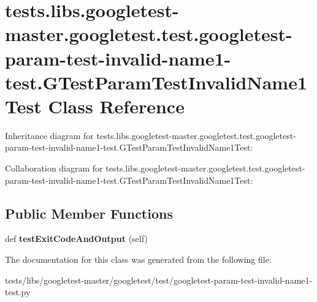 \hypertarget{classtests_1_1libs_1_1googletest-master_1_1googletest_1_1test_1_1googletest-param-test-invalid-na12366dd0912c1a7adea838865d4fa29}{}\section{tests.\+libs.\+googletest-\/master.googletest.\+test.\+googletest-\/param-\/test-\/invalid-\/name1-\/test.G\+Test\+Param\+Test\+Invalid\+Name1\+Test Class Reference}
\label{classtests_1_1libs_1_1googletest-master_1_1googletest_1_1test_1_1googletest-param-test-invalid-na12366dd0912c1a7adea838865d4fa29}


Inheritance diagram for tests.\+libs.\+googletest-\/master.googletest.\+test.\+googletest-\/param-\/test-\/invalid-\/name1-\/test.G\+Test\+Param\+Test\+Invalid\+Name1\+Test\+:


Collaboration diagram for tests.\+libs.\+googletest-\/master.googletest.\+test.\+googletest-\/param-\/test-\/invalid-\/name1-\/test.G\+Test\+Param\+Test\+Invalid\+Name1\+Test\+:
\subsection*{Public Member Functions}
\begin{DoxyCompactItemize}
\item 
\mbox{\label{classtests_1_1libs_1_1googletest-master_1_1googletest_1_1test_1_1googletest-param-test-invalid-na12366dd0912c1a7adea838865d4fa29_a17acb9201fc32aa9e45b59222353427b}} 
def {\bfseries test\+Exit\+Code\+And\+Output} (self)
\end{DoxyCompactItemize}


The documentation for this class was generated from the following file\+:\begin{DoxyCompactItemize}
\item 
tests/libs/googletest-\/master/googletest/test/googletest-\/param-\/test-\/invalid-\/name1-\/test.\+py\end{DoxyCompactItemize}
